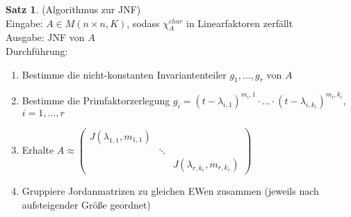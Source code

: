 \documentclass[10pt,a4paper,numbers=endperiod]{scrartcl}
\theoremstyle{definition}
\newtheorem{satz}{Satz}[section]
\begin{document}
\begin{satz}
	(Algorithmus zur JNF)\\
	Eingabe: $A \in M(n \times n, K)$, sodass $\chi_A^{char}$ in Linearfaktoren zerfällt\\
	Ausgabe: JNF von $A$\\
	Durchführung:\\
	\begin{enumerate}
		\item Bestimme die nicht-konstanten Invariantenteiler $g_1, \ldots, g_r$ von $A$\\
		\item Bestimme die Primfaktorzerlegung $g_i = (t- \lambda_{i,1})^{m_i,1} \cdot \ldots \cdot(t-\lambda_{i, k_i})^{m_i,k_i}$, $i= 1, \ldots, r$\\
		\item Erhalte $A \approx \begin{pmatrix}
		J(\lambda_{1,1}, m_{1,1}) & &\\
		& \ddots &\\
		& &J(\lambda_{r, k_r}, m_{r,k_r})
		\end{pmatrix}$
		\item Gruppiere Jordanmatrizen zu gleichen EWen zusammen (jeweils nach aufsteigender Größe geordnet)
	\end{enumerate}
\end{satz}
\newpage
\end{document}
